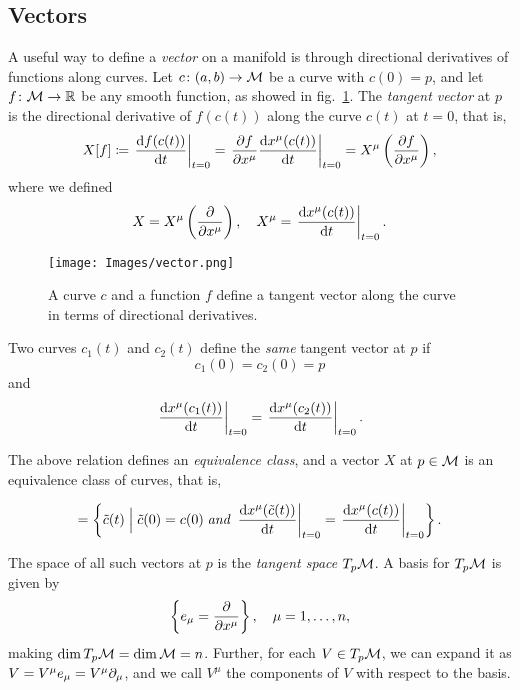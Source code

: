 \subsection{Vectors}
A useful way to define a \emph{vector} on a manifold is through directional derivatives of functions along curves. Let $c\colon (a,b) \to \mathcal{M}$ be a curve with $c(0)=p$, and let $f \colon \mathcal{M} \to \mathbb{R}$ be any smooth function, as showed in fig.~\ref{fig:vector}. The \emph{tangent vector} at $p$ is the directional derivative of $f(c(t))$ along the curve $c(t)$ at $t=0$, that is,
\begin{equation}
	X[f] \coloneq \left. \frac{\mathop{}\!\mathrm{d} f (c(t))}{\mathop{}\!\mathrm{d} t}\right|_{t=0} = \left. \frac{\partial f}{\partial x^\mu} \frac{\mathop{}\!\mathrm{d} x^\mu(c(t))}{\mathop{}\!\mathrm{d} t} \right|_{t=0} = X^\mu \left(\frac{\partial f}{\partial x^\mu}\right),
\end{equation}
where we defined
\begin{equation}\label{eq:def-vectors}
	X = X^\mu \left(\frac{\partial}{\partial x^\mu}\right), \quad X^\mu = \left. \frac{\mathop{}\!\mathrm{d} x^\mu(c(t))}{\mathop{}\!\mathrm{d} t} \right|_{t=0} .
\end{equation}

\begin{figure}
	\centering
	\texttt{[image: Images/vector.png]}
	\caption{A curve $c$ and a function $f$ define a tangent vector along the curve in terms of directional derivatives.}
	\label{fig:vector}
\end{figure}

Two curves $c_1(t)$ and $c_2(t)$ define the \emph{same} tangent vector at $p$ if
\begin{equation}
	c_1(0)= c_2(0)=p
\end{equation}
and
\begin{equation}
	\left. \frac{\mathop{}\!\mathrm{d} x^\mu(c_1(t))}{\mathop{}\!\mathrm{d} t} \right|_{t=0} = \left. \frac{\mathop{}\!\mathrm{d} x^\mu(c_2(t))}{\mathop{}\!\mathrm{d} t} \right|_{t=0} .
\end{equation}

The above relation defines an \emph{equivalence class}, and a vector $X$ at $p\in\mathcal{M}$ is an equivalence class of curves, that is,

\begin{equation}
	[c(t)] = \left\{ \tilde{c}(t) \; \Big| \; \tilde{c}(0) = c(0) \; \textit{and} \; \left. \frac{\ud x^\mu (\tilde{c}(t))}{\ud t}\right|_{t=0} = \left. \frac{\ud x^\mu (c(t))}{\ud t}\right|_{t=0} \right\} .
\end{equation}

The space of all such vectors at $p$ is the \emph{tangent space} $T_p \mathcal{M}$. A basis for $T_p \mathcal{M}$ is given by
\begin{equation}
	\left\{ e_\mu = \frac{\partial}{\partial x^\mu} \right\}   , \quad \mu = 1, \dots, n,
\end{equation}
making $\dim T_p \mathcal{M} = \dim \mathcal{M} = n$. Further, for each $V \in T_p \mathcal{M}$, we can expand it as $V = V^\mu e_\mu = V^\mu \partial_\mu$, and we call $V^\mu$ the components of $V$ with respect to the basis.

